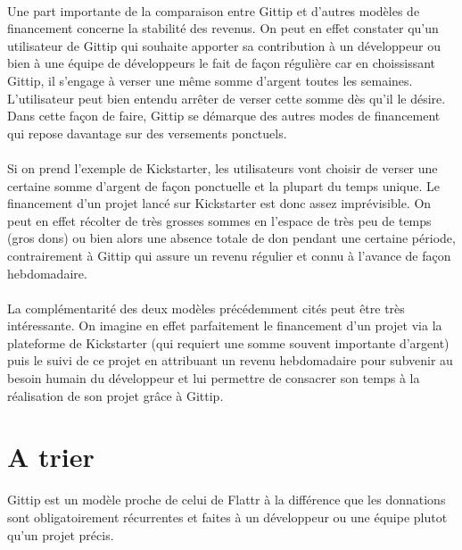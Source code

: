 \paragraph{}
Une part importante de la comparaison entre Gittip et d'autres modèles de
financement concerne la stabilité des revenus. On peut en effet constater qu'un
utilisateur de Gittip qui souhaite apporter sa contribution à un développeur ou
bien à une équipe de développeurs le fait de façon régulière car en
choississant
Gittip, il s'engage à verser une même somme d'argent toutes les semaines.
L'utilisateur peut bien entendu arrêter de verser cette somme dès qu'il le
désire. Dans cette façon de faire, Gittip se démarque des autres modes de
financement qui repose davantage sur des versements ponctuels. 

\paragraph{}
Si on prend l'exemple de Kickstarter, les utilisateurs vont choisir de verser
une certaine somme d'argent de façon ponctuelle et la plupart du temps unique.
Le financement d'un projet lancé sur Kickstarter est donc assez imprévisible.
On peut en effet récolter de très grosses sommes en l'espace de très peu de
temps
(gros dons) ou bien alors une absence totale de don pendant une certaine
période, contrairement à Gittip qui assure un revenu régulier et connu à
l'avance de façon hebdomadaire.

\paragraph{}
La complémentarité des deux modèles précédemment cités peut être très
intéressante. On
imagine en effet parfaitement le financement d'un projet via la plateforme de
Kickstarter (qui requiert une somme souvent importante d'argent) puis le suivi
de ce projet en attribuant un revenu hebdomadaire pour subvenir au besoin
humain du développeur et lui permettre de consacrer son temps à la réalisation
de son projet grâce à Gittip.


\section{A trier}
Gittip est un modèle proche de celui de Flattr à la différence que les
donnations sont obligatoirement récurrentes et faites à un développeur ou une
équipe plutot qu'un projet précis.


